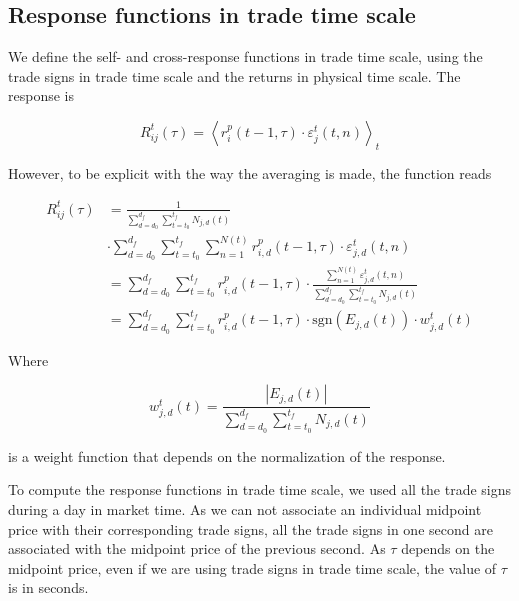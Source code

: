 \subsection{Response functions in trade time scale}
\label{subsec:response_function_trade}

We define the self- and cross-response functions in trade time scale, using the
trade signs in trade time scale and the returns in physical time scale. The
response is

\begin{equation}\label{eq:response_functions_trade_scale_general}
    R^{t}_{ij}\left(\tau\right)=\left\langle r^{p}_{i}\left(t-1,\tau
    \right)\cdot\varepsilon_{j}^{t} \left(t, n\right)\right\rangle _{t}
\end{equation}

However, to be explicit with the way the averaging is made, the function reads

\begin{align}\label{eq:response_trades_explicit}
    R_{ij}^{t}\left(\tau\right)&=\frac{1}{\sum_{d=d_{0}}^{d_{f}}
    \sum_{t=t_{0}}^{t_{f}}N_{j,d} \left(t \right)} \nonumber \\
    &\cdot\sum_{d=d_{0}}^{d_{f}}\sum_{t=t_{0}}^{t_{f}}\sum_{n=1}
    ^{N\left(t\right)} r^{p}_{i,d}\left(t-1, \tau\right)\cdot
    \varepsilon_{j,d}^{t}\left(t,n\right)\\
    &=\sum_{d=d_{0}}^{d_{f}}\sum_{t=t_{0}}^{t_{f}} r^{p}_{i,d}
    \left(t-1,\tau\right) \cdot\frac{\sum_{n=1}^{N\left(t\right)}
    \varepsilon_{j,d}^{t}\left(t,n \right)} {\sum_{d=d_{0}}^{d_{f}}
    \sum_{t=t_{0}}^{t_{f}}N_{j,d}\left(t\right)} \nonumber \\
    &=\sum_{d=d_{0}}^{d_{f}}\sum_{t=t_{0}}^{t_{f}}r^{p}_{i,d}
    \left(t-1,\tau\right) \cdot \text{sgn}\left(E_{j,d}\left(t\right)\right)
    \cdot w_{j,d}^{t}\left(t\right)
\end{align}

Where

\begin{equation}\label{eq:trade_weight}
    w_{j,d}^{t}\left(t\right) = \frac{\left|E_{j,d}\left(t\right)\right|}
    {\sum_{d=d_{0}}^{d_{f}}\sum_{t=t_{0}}^{t_{f}}N_{j,d} \left(t\right)}
\end{equation}

is a weight function that depends on the normalization of the response.

To compute the response functions in trade time scale, we used all the trade
signs during a day in market time. As we can not associate an individual
midpoint price with their corresponding trade signs, all the trade signs in one
second are associated with the midpoint price of the previous second.
As $\tau$ depends on the midpoint price, even if we are using trade signs in
trade time scale, the value of $\tau$ is in seconds.

